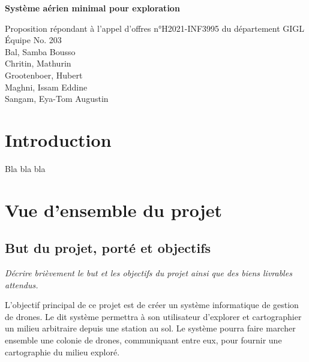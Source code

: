 \documentclass{mistcoursedoc}
\author{Équipe \equipe}
\newcommand{\equipe}{203}
\begin{document}
\maketitle
\vspace{2cm}
\begin{center}

  {\Huge\bf Système aérien minimal pour exploration\\[3em]}

  \Large Proposition répondant à l’appel d’offres  n°H2021-INF3995 du département GIGL\\[3em]


  Équipe No. \equipe\\[3em]

  Bal, Samba Bousso\\[1em]
  Chritin, Mathurin\\[1em]
  Grootenboer, Hubert\\[1em]
  Maghni, Issam Eddine\\[1em]
  Sangam, Eya-Tom Augustin\\[1em]

  \vfill

\end{center}

\newpage
{
    \renewcommand{\contentsname}{Table des matières}
    \hypersetup{hidelinks}
    \setcounter{secnumdepth}{3}
    \setcounter{tocdepth}{3}
    \tableofcontents
}
\newpage

\section*{Introduction}

Bla bla bla

\section{Vue d’ensemble du projet}

\subsection{But du projet, porté et objectifs}

\textit{Décrire brièvement le but et les objectifs du projet ainsi que des biens livrables attendus.}

\par L'objectif principal de ce projet est de créer un système informatique de gestion de drones.
Le dit système permettra à son utilisateur d'explorer et cartographier un milieu arbitraire depuis une station au sol.
Le système pourra faire marcher ensemble une colonie de drones, communiquant entre eux, pour fournir une cartographie du milieu exploré.
\end{document}
